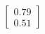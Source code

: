 \documentclass[preview]{standalone}
\begin{document}
\begin{align*}
\begin{bmatrix} 0.79 \\ 0.51 \end{bmatrix}
\end{align*}
\end{document}
